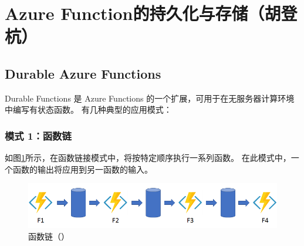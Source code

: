 \section{Azure Function的持久化与存储（胡登杭）}\label{sec:serverless_DB}
\subsection{Durable Azure Functions}
Durable Functions 是 Azure Functions 的一个扩展，可用于在无服务器计算环境中编写有状态函数。  
有几种典型的应用模式：
\subsubsection{模式 1：函数链}
如图\ref{fig:model1}所示，在函数链接模式中，将按特定顺序执行一系列函数。 在此模式中，一个函数的输出将应用到另一函数的输入。
\begin{figure}[!htbp]
	\centering
	\includegraphics[width=0.8\linewidth]{figs/model1}
	\caption{函数链（\cite{Durable}）}
	\label{fig:model1}
\end{figure}

